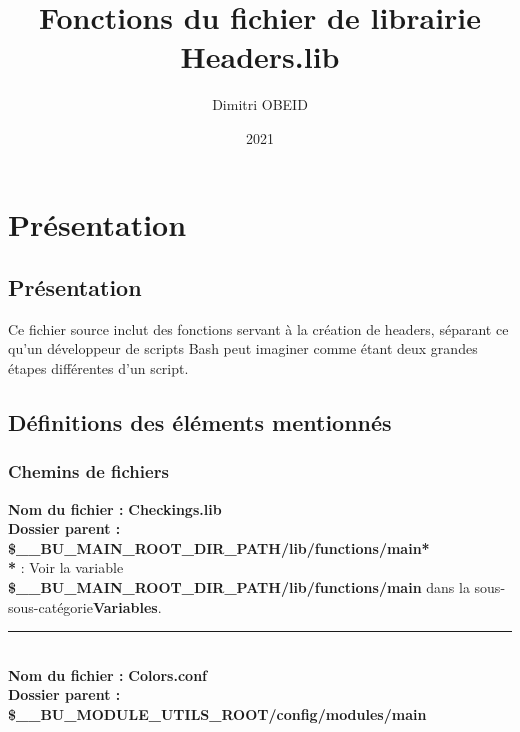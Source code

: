 \documentclass[a4paper,10pt]{article}
\title{\color{red}Fonctions du fichier de librairie \color{lime}Headers.lib}\color{white}
\author{Dimitri OBEID}
\date{2021}
\begin{document}
 \maketitle
 \tableofcontents
 \newpage

\color{red}
\section{Présentation}\color{white}

\color{green}
\subsection{Présentation}\color{white}
Ce fichier source inclut des fonctions servant à la création de headers, séparant ce qu'un développeur de scripts Bash peut imaginer comme étant deux grandes étapes différentes d'un script.\\[1\baselineskip]

\color{green}
\subsection{Définitions des éléments mentionnés}\color{white}

\color{blue}
\subsubsection{Chemins de fichiers}\color{white}
\textbf{Nom du fichier :} \textbf{\color{lime}Checkings.lib\color{white}}\\[1\baselineskip]
\textbf{Dossier parent :} \textbf{\color{lime}\$\_\_BU\_MAIN\_ROOT\_DIR\_PATH/lib/functions/main\color{white}*}\\[1\baselineskip]

\textbf{*} : Voir la variable \textbf{\color{orange}\$\_\_BU\_MAIN\_ROOT\_DIR\_PATH/lib/functions/main\color{white}} dans la sous-sous-catégorie\linebreak \textbf{\color{blue}Variables\color{white}}.\\[1\baselineskip]



\color{lime}\par\noindent\rule{\textwidth}{0.4pt}\color{white}\\[1\baselineskip]

\textbf{Nom du fichier :} \textbf{\color{lime}Colors.conf\color{white}}\\[1\baselineskip]
\textbf{Dossier parent :} \textbf{\color{lime}\$\_\_BU\_MODULE\_UTILS\_ROOT/config/modules/main\color{white}}\\[1\baselineskip]
\end{document}
